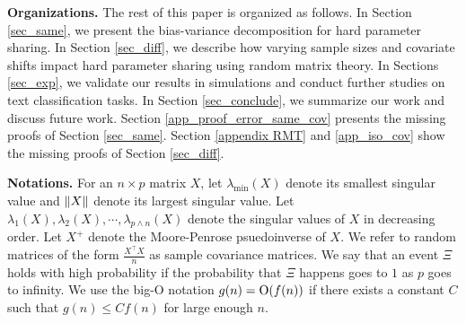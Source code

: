 


\smallskip
\noindent\textbf{Organizations.}
The rest of this paper is organized as follows.
In Section \ref{sec_same}, we present the bias-variance decomposition for hard parameter sharing.
In Section \ref{sec_diff}, we describe how varying sample sizes and covariate shifts impact hard parameter sharing using random matrix theory.
In Sections \ref{sec_exp}, we validate our results in simulations and conduct further studies on text classification tasks.
In Section \ref{sec_conclude}, we summarize our work and discuss future work.
Section \ref{app_proof_error_same_cov} presents the missing proofs of Section \ref{sec_same}.
Section \ref{appendix RMT} and \ref{app_iso_cov} show the missing proofs of Section \ref{sec_diff}.

\medskip
\noindent\textbf{Notations.}
For an $n\times p$ matrix $X$, let $\lambda_{\min}(X)$ denote its smallest singular value and $\|X\|$ denote its largest singular value.
Let $\lambda_1(X), \lambda_2(X), \cdots, \lambda_{p\wedge n}(X)$ denote the singular values of $X$ in decreasing order.
Let $X^+$ denote the Moore-Penrose psuedoinverse of $X$.
We refer to random matrices of the form $\frac {X^\top X} n$ as sample covariance matrices.
We say that an event $\Xi$ holds with high probability if the probability that $\Xi$ happens goes to $1$ as $p$ goes to infinity.
We use the big-O notation $g(n) = \operatorname{O}(f(n))$ if there exists a constant $C$ such that $g(n) \le C  f(n)$ for large enough $n$.

